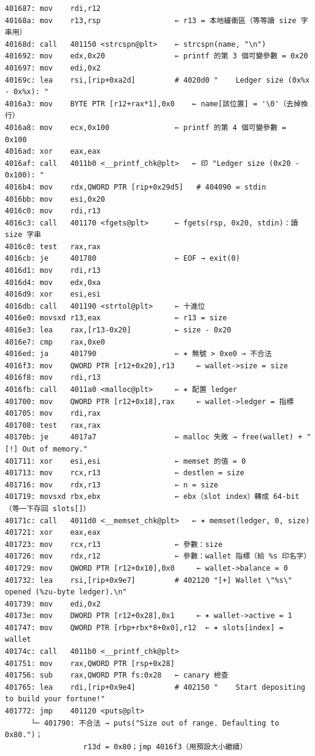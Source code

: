 \documentclass[10pt,a4paper]{article}
\begin{document}
\begin{Verbatim}[breaklines=true,breakanywhere=true,breakautoindent=false,fontsize=\fontsize{7.0}{9.5}\selectfont]
401687: mov    rdi,r12
40168a: mov    r13,rsp                 ← r13 = 本地緩衝區（等等讀 size 字串用）
40168d: call   401150 <strcspn@plt>    ← strcspn(name, "\n")
401692: mov    edx,0x20                ← printf 的第 3 個可變參數 = 0x20
401697: mov    edi,0x2
40169c: lea    rsi,[rip+0xa2d]         # 4020d0 "    Ledger size (0x%x - 0x%x): "
4016a3: mov    BYTE PTR [r12+rax*1],0x0    ← name[該位置] = '\0'（去掉換行）
4016a8: mov    ecx,0x100               ← printf 的第 4 個可變參數 = 0x100
4016ad: xor    eax,eax
4016af: call   4011b0 <__printf_chk@plt>   ← 印 "Ledger size (0x20 - 0x100): "
4016b4: mov    rdx,QWORD PTR [rip+0x29d5]   # 404090 = stdin
4016bb: mov    esi,0x20
4016c0: mov    rdi,r13
4016c3: call   401170 <fgets@plt>      ← fgets(rsp, 0x20, stdin)：讀 size 字串
4016c8: test   rax,rax
4016cb: je     401780                  ← EOF → exit(0)
4016d1: mov    rdi,r13
4016d4: mov    edx,0xa
4016d9: xor    esi,esi
4016db: call   401190 <strtol@plt>     ← 十進位
4016e0: movsxd r13,eax                 ← r13 = size
4016e3: lea    rax,[r13-0x20]          ← size - 0x20
4016e7: cmp    rax,0xe0
4016ed: ja     401790                  ← ✶ 無號 > 0xe0 → 不合法
4016f3: mov    QWORD PTR [r12+0x20],r13     ← wallet->size = size
4016f8: mov    rdi,r13
4016fb: call   4011a0 <malloc@plt>     ← ✶ 配置 ledger
401700: mov    QWORD PTR [r12+0x18],rax     ← wallet->ledger = 指標
401705: mov    rdi,rax
401708: test   rax,rax
40170b: je     4017a7                  ← malloc 失敗 → free(wallet) + "[!] Out of memory."
401711: xor    esi,esi                 ← memset 的值 = 0
401713: mov    rcx,r13                 ← destlen = size
401716: mov    rdx,r13                 ← n = size
401719: movsxd rbx,ebx                 ← ebx（slot index）轉成 64-bit（等一下存回 slots[]）
40171c: call   4011d0 <__memset_chk@plt>   ← ✶ memset(ledger, 0, size)
401721: xor    eax,eax
401723: mov    rcx,r13                 ← 參數：size
401726: mov    rdx,r12                 ← 參數：wallet 指標（給 %s 印名字）
401729: mov    QWORD PTR [r12+0x10],0x0     ← wallet->balance = 0
401732: lea    rsi,[rip+0x9e7]         # 402120 "[+] Wallet \"%s\" opened (%zu-byte ledger).\n"
401739: mov    edi,0x2
40173e: mov    DWORD PTR [r12+0x28],0x1     ← ✶ wallet->active = 1
401747: mov    QWORD PTR [rbp+rbx*8+0x0],r12  ← ✶ slots[index] = wallet
40174c: call   4011b0 <__printf_chk@plt>
401751: mov    rax,QWORD PTR [rsp+0x28]
401756: sub    rax,QWORD PTR fs:0x28   ← canary 檢查
401765: lea    rdi,[rip+0x9e4]         # 402150 "    Start depositing to build your fortune!"
401772: jmp    401120 <puts@plt>
      └─ 401790: 不合法 → puts("Size out of range. Defaulting to 0x80.")；
                  r13d = 0x80；jmp 4016f3（用預設大小繼續）
\end{Verbatim}
\end{document}
